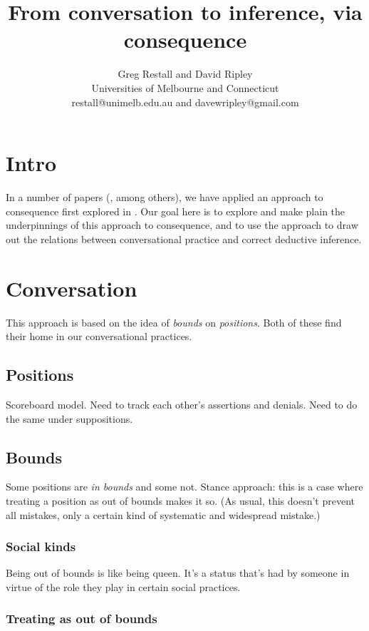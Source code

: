 \documentclass{article}
\title{From conversation to inference, via consequence}
\author{Greg Restall and David Ripley\\Universities of Melbourne and Connecticut\\restall@unimelb.edu.au and davewripley@gmail.com}
\begin{document}
\maketitle

\section{Intro}

In a number of papers (\cite{restall:tvpt, restall:cf2d, restall:adnct, ripley:pafc, ripley:bcw}, among others), we have applied an approach to consequence first explored in \cite{restall:mc}.
Our goal here is to explore and make plain the underpinnings of this approach to consequence, and to use the approach to draw out the relations between conversational practice and correct deductive inference.

\section{Conversation}

This approach is based on the idea of {\em bounds} on {\em positions}.
Both of these find their home in our conversational practices.

\subsection{Positions}

Scoreboard model.
Need to track each other's assertions and denials.
Need to do the same under suppositions. 

\subsection{Bounds}

Some positions are {\em in bounds} and some not.
Stance approach: this is a case where treating a position as out of bounds makes it so.
(As usual, this doesn't prevent all mistakes, only a certain kind of systematic and widespread mistake.)

\subsubsection{Social kinds}

Being out of bounds is like being queen.
It's a status that's had by someone in virtue of the role they play in certain social practices.

\subsubsection{Treating as out of bounds} \label{treating}
\end{document}

